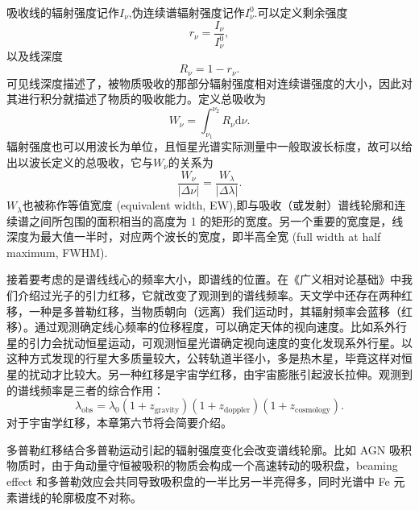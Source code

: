 \documentclass[../天体物理基础.tex]{subfiles}
\begin{document}
吸收线的辐射强度记作$I_{\nu}$,伪连续谱辐射强度记作$I_{\nu}^{0}$.可以定义剩余强度
\begin{equation}
r_{\nu}=\frac{I_{\nu}}{I_{\nu}^{0}},
\end{equation}
以及线深度
\begin{equation}
R_{\nu}=1-r_{\nu}.
\end{equation}
可见线深度描述了，被物质吸收的那部分辐射强度相对连续谱强度的大小，因此对其进行积分就描述了物质的吸收能力。定义总吸收为
\begin{equation}
W_{\nu}=\int_{\nu_{1}}^{\nu_{2}}R_{\nu}\mathrm{d}\nu.
\end{equation}
辐射强度也可以用波长为单位，且恒星光谱实际测量中一般取波长标度，故可以给出以波长定义的总吸收，它与$W_{\nu}$的关系为
\begin{equation}
\frac{W_{\nu}}{\left\vert{}\Delta{}\nu\right\vert{}}=\frac{W_{\lambda}}{\left\vert{}\Delta{}\lambda\right\vert{}}.
\end{equation}
$W_{\lambda}$也被称作等值宽度 (equivalent width, EW),即与吸收（或发射）谱线轮廓和连续谱之间所包围的面积相当的高度为 1 的矩形的宽度。另一个重要的宽度是，线深度为最大值一半时，对应两个波长的宽度，即半高全宽 (full width at half maximum, FWHM).

接着要考虑的是谱线线心的频率大小，即谱线的位置。在《广义相对论基础》中我们介绍过光子的引力红移，它就改变了观测到的谱线频率。天文学中还存在两种红移，一种是多普勒红移，当物质朝向（远离）我们运动时，其辐射频率会蓝移（红移）。通过观测确定线心频率的位移程度，可以确定天体的视向速度。比如系外行星的引力会扰动恒星运动，可观测恒星光谱确定视向速度的变化发现系外行星。以这种方式发现的行星大多质量较大，公转轨道半径小，多是热木星，毕竟这样对恒星的扰动才比较大。另一种红移是宇宙学红移，由宇宙膨胀引起波长拉伸。观测到的谱线频率是三者的综合作用：
\begin{equation}
\lambda_{\text{obs}}=\lambda_{0}\left(1+z_{\text{gravity}}\right)\left(1+z_{\text{doppler}}\right)\left(1+z_{\text{cosmology}}\right).
\end{equation}
对于宇宙学红移，本章第六节将会简要介绍。

多普勒红移结合多普勒运动引起的辐射强度变化会改变谱线轮廓。比如 AGN 吸积物质时，由于角动量守恒被吸积的物质会构成一个高速转动的吸积盘，beaming effect 和多普勒效应会共同导致吸积盘的一半比另一半亮得多，同时光谱中 Fe 元素谱线的轮廓极度不对称。
\end{document}
